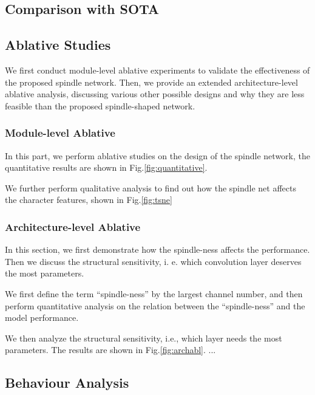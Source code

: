 \subsection{Comparison with SOTA}


\subsection{Ablative Studies}
We first conduct module-level ablative experiments to validate the effectiveness of the proposed spindle network. Then, we provide an extended architecture-level ablative analysis, discussing various other possible designs and why they are less feasible than the proposed spindle-shaped network.  

\subsubsection{Module-level Ablative}



In this part, we perform ablative studies on the design of the spindle network, the quantitative results are shown in Fig.\ref{fig:quantitative}.%


We further perform qualitative analysis to find out how the spindle net affects the character features, shown in Fig.\ref{fig:tsne}  



\subsubsection{Architecture-level Ablative}
In this section, we first demonstrate how the spindle-ness affects the performance. Then we discuss the structural sensitivity, i. e. which convolution layer deserves the most parameters.

We first define the term ``spindle-ness'' by the largest channel number, %
and then perform quantitative analysis on the relation between the ``spindle-ness'' and the model performance.


We then analyze the structural sensitivity, i.e., which layer needs the most parameters. The results are shown in Fig.\ref{fig:archabl}. ... %

\subsection{Behaviour Analysis}

